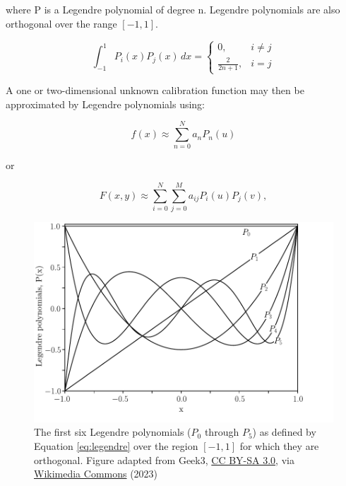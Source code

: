 \noindent where P is a Legendre polynomial of degree n. Legendre polynomials are also orthogonal over the range $[-1, 1]$.
\prgph

\begin{equation}
    \int_{-1}^{1} P_{i}(x) P_{j}(x) \,dx =
    \begin{cases}
        0,                 & i \neq j \\
        \frac{2}{2 n + 1}, & i = j
    \end{cases}
    \label{eq:legorth}
\end{equation}

A one or two-dimensional unknown calibration function may then be approximated by Legendre polynomials using:

\begin{equation}
    f(x) \approx \sum_{n = 0}^{N} a_{n} P_{n}(u)
    \label{eq:legendre}
\end{equation}

\noindent or

\begin{equation}
    F(x, y) \approx \sum_{i = 0}^{N} \sum_{j = 0}^{M} a_{ij} P_{i}(u) P_{j}(v),
    \label{eq:Legendre2D}
\end{equation}

\begin{figure}[t]
    \centering
    \includegraphics[width = 12cm]{figures/2_legendre.pdf}
    \caption{The first six Legendre polynomials ($P_0$ through $P_{5}$) as defined by Equation \ref{eq:legendre} over the region $[-1, 1]$ for which they are orthogonal. Figure adapted from Geek3, \protect\href{https://creativecommons.org/licenses/by-sa/3.0}{CC BY-SA 3.0}, via \protect\href{https://commons.wikimedia.org/wiki/File:Legendrepolynomials6.svg}{Wikimedia Commons} (2023)}
    \label{fig:legendre}
\end{figure}

